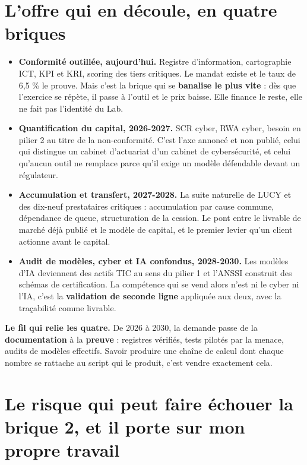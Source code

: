 \documentclass[11pt,a4paper]{article}
\newcommand{\encadre}[2]{%
  \vspace{3pt}\noindent\colorbox{grisclair}{%
  \begin{minipage}{\dimexpr\textwidth-2\fboxsep}
  \small\textbf{#1} #2
  \end{minipage}}\vspace{4pt}}
\begin{document}
\section{L'offre qui en découle, en quatre briques}

\begin{itemize}
\item \textbf{Conformité outillée, aujourd'hui.} Registre d'information, cartographie ICT, KPI et
      KRI, scoring des tiers critiques. Le mandat existe et le taux de 6,5 \% le prouve. Mais
      c'est la brique qui se \textbf{banalise le plus vite} : dès que l'exercice se répète, il
      passe à l'outil et le prix baisse. Elle finance le reste, elle ne fait pas l'identité du
      Lab.
\item \textbf{Quantification du capital, 2026-2027.} SCR cyber, RWA cyber, besoin en pilier 2 au
      titre de la non-conformité. C'est l'axe annoncé et non publié, celui qui distingue un
      cabinet d'actuariat d'un cabinet de cybersécurité, et celui qu'aucun outil ne remplace
      parce qu'il exige un modèle défendable devant un régulateur.
\item \textbf{Accumulation et transfert, 2027-2028.} La suite naturelle de LUCY et des dix-neuf
      prestataires critiques : accumulation par cause commune, dépendance de queue, structuration
      de la cession. Le pont entre le livrable de marché déjà publié et le modèle de capital, et
      le premier levier qu'un client actionne avant le capital.
\item \textbf{Audit de modèles, cyber et IA confondus, 2028-2030.} Les modèles d'IA deviennent
      des actifs TIC au sens du pilier 1 et l'ANSSI construit des schémas de certification. La
      compétence qui se vend alors n'est ni le cyber ni l'IA, c'est la \textbf{validation de
      seconde ligne} appliquée aux deux, avec la traçabilité comme livrable.
\end{itemize}

\encadre{Le fil qui relie les quatre.}{De 2026 à 2030, la demande passe de la
\textbf{documentation} à la \textbf{preuve} : registres vérifiés, tests pilotés par la menace,
audits de modèles effectifs. Savoir produire une chaîne de calcul dont chaque nombre se rattache
au script qui le produit, c'est vendre exactement cela.}

\section{Le risque qui peut faire échouer la brique 2, et il porte sur mon propre travail}
\end{document}
